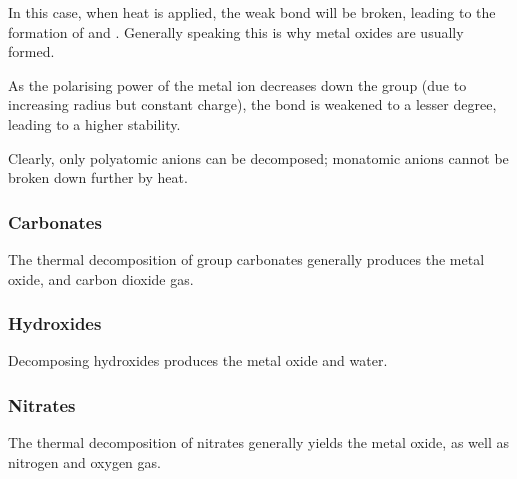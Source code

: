 			In this case, when heat is applied, the weak bond will be broken, leading to the formation of
			 and . Generally speaking this is why metal oxides are usually formed.

			As the polarising power of the metal ion decreases down the group (due to increasing radius but
			constant charge), the bond is weakened to a lesser degree, leading to a higher stability.

			Clearly, only polyatomic anions can be decomposed; monatomic anions cannot be broken down further
			by heat.


			\subsubsection{Carbonates}

				The thermal decomposition of group \rtwo{} carbonates generally produces the metal oxide,
				and carbon dioxide gas.




			\subsubsection{Hydroxides}

				Decomposing hydroxides produces the metal oxide and water.





			\subsubsection{Nitrates}

				The thermal decomposition of nitrates generally yields the metal oxide, as well as nitrogen
				and oxygen gas.


